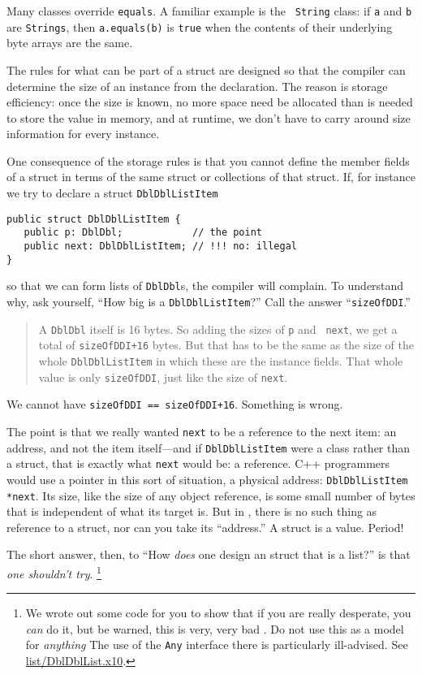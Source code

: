 Many classes override {\tt equals}.  A familiar example is the {\tt
String} class: if {\tt a} and {\tt b} are {\tt Strings}, then {\tt a.equals(b)}
is {\tt true} when the contents of their underlying byte arrays are the same.

The rules for what can be part of a struct are designed so that the compiler
can determine the size of an instance from the declaration.  The reason is
storage efficiency:  once the size is known, no more space need be allocated
than is needed to store the value in memory, and at runtime, we don't have to
carry around size information for every instance.

One consequence of the storage rules is that you cannot define the member
fields of a struct in terms of the same struct or collections of that
struct.  If, for instance we try to declare a struct {\tt DblDblList\-Item} 
\begin{verbatim}
public struct DblDblListItem {
   public p: DblDbl;            // the point
   public next: DblDblListItem; // !!! no: illegal
}
\end{verbatim}
so that we can form lists of {\tt DblDbl}s, the compiler will complain.
To understand why, ask yourself, ``How big is a {\tt DblDbl\-List\-Item}?''
Call the answer ``{\tt sizeOfDDI}.''
\begin{quote}
A {\tt DblDbl}
itself is 16 bytes. So adding the sizes of {\tt p} and {\tt
next}, we get a total of {\tt sizeOfDDI+16} bytes.
But that has to be the same as the size of the whole {\tt DblDblList\-Item} in
which these are the instance fields. That whole value is only {\tt sizeOfDDI},
just like the size of {\tt next}.
\end{quote}
We cannot have {\tt  sizeOfDDI == sizeOfDDI+16}.  Something is wrong.

The point is that we really wanted {\tt next} to be a reference to the next
item: an address, and not the item itself---and if {\tt DblDbl\-List\-Item} were a
class rather than a struct, that is exactly what {\tt next} would be: a
reference. C++ programmers would use a pointer in this sort of situation, a
physical address: {\tt DblDbl\-List\-Item *next}.  Its size, like the size
of any object reference, is some small number of bytes that is independent of
what its target is. But in \Xten, there is no such thing as reference to a
struct, nor can you take its ``address.''  A struct is a value. Period!

The short answer, then, to ``How {\em does} one design an \Xten{}
struct that is a list?'' is that {\em one shouldn't try}.  
\footnote{
We wrote out some code for you to show that if you are really desperate, you 
{\em can} do it, but be warned, this is very, very bad \Xten.  Do not use this
as a model for {\em anything}  The use of the {\tt Any} interface there is
particularly ill-advised. See 
\href{http://dist.codehaus.org/x10/documentation/guide/src/list/DblDblList.x10}{list/DblDblList.x10}.
}

